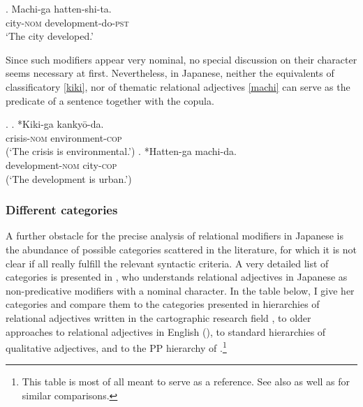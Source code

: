 \documentclass [output=book,colorlinks,citecolor=brown]{langscibook}
\begin{document}
\exg. Machi-ga hatten-shi-ta.\\
city-\textsc{nom} development-do-\textsc{pst}\\
`The city developed.’ \label{machi-ga hatten}

Since such modifiers appear very nominal, no special discussion on their character seems necessary at first. Nevertheless, in Japanese, neither the equivalents of classificatory \ref{kiki}, nor of thematic relational adjectives \ref{machi} can serve as the predicate of a sentence together with the copula.

\newpage

\ex. \ag. *Kiki-ga kankyō-da.\\
crisis-\textsc{nom} environment-\textsc{cop}\\
(`The crisis is environmental.’) \label{kiki}
\bg. *Hatten-ga machi-da.\\
development-\textsc{nom} city-\textsc{cop}\\
(`The development is urban.’) \label{machi}

\subsubsection{Different categories}

A further obstacle for the precise analysis of relational modifiers in Japanese is the abundance of possible categories scattered in the literature, for which it is not clear if all really fulfill the relevant syntactic criteria. A very detailed list of categories is presented in \citet[53–54]{nagano:2016:are}, who understands relational adjectives in Japanese as non-predicative modifiers with a nominal character. In the table below, I give her categories and compare them to the categories presented in hierarchies of relational adjectives written in the cartographic research field \citep{rae:2010:ordering, bortolotto:2016:RA}, to older approaches to relational adjectives in English (\citealt{downing:1977:creation, levi:1978:syntax, warren:1984:classifying}), to standard hierarchies of qualitative adjectives, and to the PP hierarchy of \citet{takamine:2010:hierarchy}.\footnote{This table is most of all meant to serve as a reference. See also \citet[93–94]{bortolotto:2016:RA} as well as \citet[16]{rainer:2013:can} for similar comparisons.} %
\end{document}

